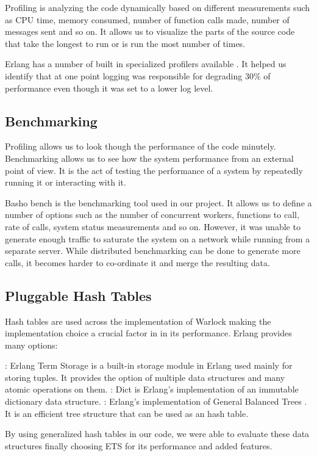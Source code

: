 Profiling is analyzing the code dynamically based on different measurements such
as CPU time, memory consumed, number of function calls made, number of messages
sent and so on. It allows us to visualize the parts of the source code that take
the longest to run or is run the most number of times.

Erlang has a number of built in specialized profilers available
\citep{erlang.profiling}. It helped us identify that at one point logging was
responsible for degrading 30\% of performance even though it was set to a
lower log level.

\subsection{Benchmarking}

Profiling allows us to look though the performance of the code minutely.
Benchmarking allows us to see how the system performance from an external
point of view. It is the act of testing the performance of a system by
repeatedly running it or interacting with it.

Basho bench \citep{basho.bench} is the benchmarking tool used in our project.
It allows us to define a number of options such as the number of concurrent
workers, functions to call, rate of calls, system status measurements and so
on. However, it was unable to generate enough traffic to saturate the system
on a network while running from a separate server. While distributed
benchmarking can be done to generate more calls, it becomes harder to
co-ordinate it and merge the resulting data.

\subsection{Pluggable Hash Tables}

Hash tables are used across the implementation of Warlock making the
implementation choice a crucial factor in in its performance. Erlang provides
many options:

\begin{itemize}
    : Erlang Term Storage is a built-in storage module in Erlang
    used mainly for storing tuples. It provides the option of multiple data
    structures and many atomic operations on them.
    : Dict is Erlang's implementation of an immutable dictionary
    data structure.
    : Erlang's implementation of General Balanced Trees
    \citep{Andersson99}. It is an efficient tree structure that can be used
    as an hash table.
\end{itemize}

By using generalized hash tables in our code, we were able to evaluate these
data structures finally choosing ETS for its performance and added features.
